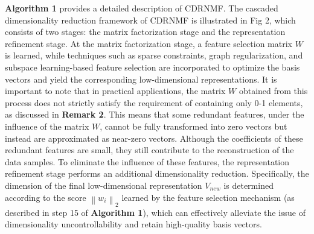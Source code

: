 \documentclass[a4paper,fleqn]{cas-sc}
\begin{document}
\textbf{Algorithm 1} provides a detailed description of CDRNMF. The cascaded dimensionality reduction framework of CDRNMF is illustrated in Fig 2, which consists of two stages: the matrix factorization stage and the representation refinement stage. At the matrix factorization stage, a feature selection matrix $W$ is learned, while techniques such as sparse constraints, graph regularization, and subspace learning-based feature selection are incorporated to optimize the basis vectors and yield the corresponding low-dimensional representations. It is important to note that in practical applications, the matrix $W$ obtained from this process does not strictly satisfy the requirement of containing only 0-1 elements, as discussed in \textbf{Remark 2}. This means that some redundant features, under the influence of the matrix $W$, cannot be fully transformed into zero vectors but instead are approximated as near-zero vectors. Although the coefficients of these redundant features are small, they still contribute to the reconstruction of the data samples. To eliminate the influence of these features, the representation refinement stage performs an additional dimensionality reduction. Specifically, the dimension of the final low-dimensional representation $V_{new}$ is determined according to the score $\left\|w_i\right\|_2$ learned by the feature selection mechanism (as described in step 15 of \textbf{Algorithm 1}), which can effectively alleviate the issue of dimensionality uncontrollability and retain high-quality basis vectors.
\end{document}
